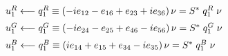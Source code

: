 \documentclass[letterpaper,12pt,titlepage,oneside,final]{book}
\newcommand{\spacer}{0.2cm}
\begin{document}
\begin{equation}\begin{array}{l}\label{newtriplet}
u_1^R\longleftarrow q^R_{1}\equiv\left(-ie_{12}-e_{16}+e_{23}+ie_{36}\right)\nu  = S^*\hspace{1mm} q^R_{1}\hspace{1mm}\nu  \vspace{\spacer} \\
u_1^G\longleftarrow q^G_{1}\equiv\left(-ie_{24}-e_{25}+e_{46}-ie_{56}\right)\nu = S^*\hspace{1mm} q^G_{1}\hspace{1mm}\nu\vspace{\spacer} \\
u_1^B\longleftarrow q^B_{1}\equiv\left(ie_{14}+e_{15}+e_{34}-ie_{35}\right)\nu = S^*\hspace{1mm} q^B_{1}\hspace{1mm}\nu\vspace{\spacer} \\
\end{array}\end{equation}
\end{document}
